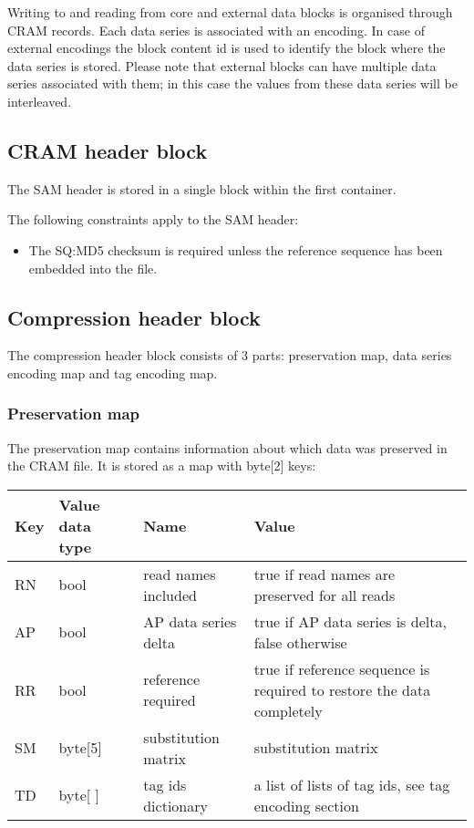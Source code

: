 \documentclass[a4paper]{article}
\begin{document}
Writing to and reading from core and external data blocks is organised through 
CRAM records. Each data series is associated with an encoding. In case of external 
encodings the block content id is used to identify the block where the data series 
is stored. Please note that external blocks can have multiple data series associated 
with them; in this case the values from these data series will be interleaved. 


\subsection{\textbf{CRAM header block}}

The SAM header is stored in a single block within the first container. 

The following constraints apply to the SAM header: 

\begin{itemize}
\item The SQ:MD5 checksum is required unless the reference sequence has been embedded 
into the file.
\end{itemize}

\subsection{\textbf{Compression header block}}
\label{subsec:compression-header}

The compression header block consists of 3 parts: preservation map, data series 
encoding map and tag encoding map.

\subsubsection*{Preservation map}

The preservation map contains information about which data was preserved in the 
CRAM file. It is stored as a map with byte[2] keys:

\begin{tabular}{|l|l|>{\raggedright}p{100pt}|>{\raggedright}p{220pt}|}
\hline
\textbf{Key} & \textbf{Value data type} & \textbf{Name} & \textbf{Value}\tabularnewline
\hline
RN & bool & read names included & true if read names are preserved for all reads\tabularnewline
\hline
AP & bool & AP data series delta & true if AP data series is delta, false otherwise\tabularnewline
\hline
RR & bool & reference required & true if reference sequence is required to restore 
the data completely\tabularnewline
\hline
SM & byte[5] & substitution matrix & substitution matrix\tabularnewline
\hline
TD & byte[ ] & tag ids dictionary & a list of lists of tag ids, see tag encoding 
section\tabularnewline
\hline
\end{tabular}
\end{document}

